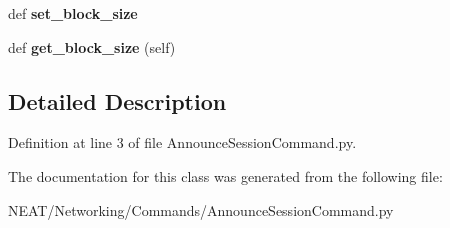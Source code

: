 \begin{DoxyCompactItemize}
\item 
def {\bfseries set\+\_\+block\+\_\+size}\hypertarget{class_n_e_a_t___py_genetics_1_1_n_e_a_t_1_1_networking_1_1_commands_1_1_announce_session_command_1_1_announce_session_command_a4b4d1a2f45cbe7e4be0658a3751e9dc3}{}\label{class_n_e_a_t___py_genetics_1_1_n_e_a_t_1_1_networking_1_1_commands_1_1_announce_session_command_1_1_announce_session_command_a4b4d1a2f45cbe7e4be0658a3751e9dc3}

\item 
def {\bfseries get\+\_\+block\+\_\+size} (self)\hypertarget{class_n_e_a_t___py_genetics_1_1_n_e_a_t_1_1_networking_1_1_commands_1_1_announce_session_command_1_1_announce_session_command_af6a3e5c83d5d990c909ef038272d797e}{}\label{class_n_e_a_t___py_genetics_1_1_n_e_a_t_1_1_networking_1_1_commands_1_1_announce_session_command_1_1_announce_session_command_af6a3e5c83d5d990c909ef038272d797e}

\end{DoxyCompactItemize}


\subsection{Detailed Description}


Definition at line 3 of file Announce\+Session\+Command.\+py.



The documentation for this class was generated from the following file\+:\begin{DoxyCompactItemize}
\item 
N\+E\+A\+T/\+Networking/\+Commands/Announce\+Session\+Command.\+py\end{DoxyCompactItemize}
